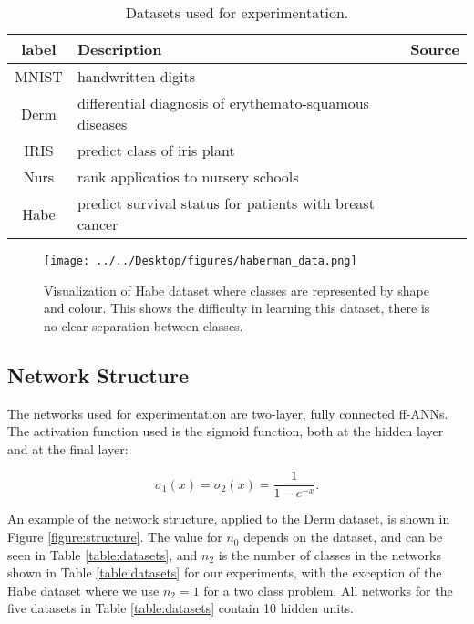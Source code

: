 \documentclass[letterpaper,12pt,titlepage,oneside,final]{book}
\begin{document}
	\begin{table}[h]
		\begin{center}
			\begin{tabular}{ |c|l|c| }  
				\hline
				\textbf{label} & \textbf{Description} & \textbf{Source}\\
				\hline
				MNIST & handwritten digits & \cite{mnist}\\
				\hline
				Derm & differential diagnosis of erythemato-squamous diseases & \cite{Derm}\\
				\hline
				IRIS & predict class of iris plant & \cite{IRIS}\\
				\hline
				Nurs & rank applicatios to nursery schools & \cite{Nurs}\\
				\hline
				Habe & predict survival status for patients with breast cancer  & \cite{Habe}\\ 
				\hline
			\end{tabular}
		\end{center}
		\caption{Datasets used for experimentation.}
		\label{table:datasettopics}
	\end{table}
	
	\begin{figure}[h]
		\centering
		\texttt{[image: ../../Desktop/figures/haberman\_data.png]}
		\caption{Visualization of Habe dataset where classes are represented by shape and colour. This shows the difficulty in learning this dataset, there is no clear separation between classes.}
		\label{figure:haberman}
	\end{figure}
	
	
	\subsection{Network Structure}
	
	The networks used for experimentation are two-layer, fully connected ff-ANNs. The activation function used is the sigmoid function, both at the hidden layer and at the final layer:
	
	\begin{equation}
	\sigma_{1}(x) = \sigma_{2}(x) = \frac{1}{1 - e^{-x}}.
	\end{equation}
	
	An example of the network structure, applied to the Derm dataset, is shown in Figure \ref{figure:structure}. The value for $n_{0}$ depends on the dataset, and can be seen in Table \ref{table:datasets}, and $n_{2}$ is the number of classes in the networks shown in Table
	\ref{table:datasets} for our experiments, with the exception of the Habe dataset where we use $n_{2} = 1$ for a two class problem. All networks for the five datasets in Table \ref{table:datasets} contain 10 hidden units. 
	
\end{document}
